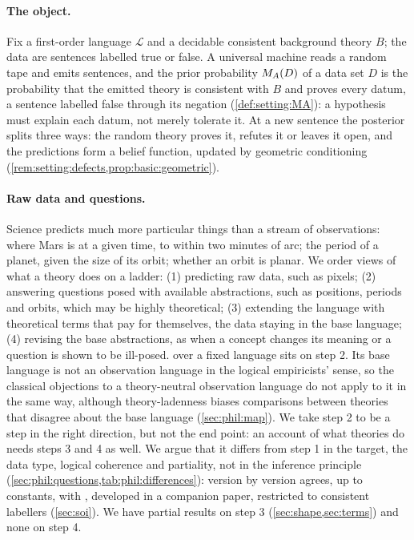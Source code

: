 \paragraph{The object.} Fix a first-order language $\mathcal L$ and a decidable consistent background theory $B$; the data are sentences labelled true or false. A universal machine reads a random tape and emits sentences, and the prior probability $M_{A}(D)$ of a data set $D$ is the probability that the emitted theory is consistent with $B$ and proves every datum, a sentence labelled false through its negation (\cref{def:setting:MA}): a hypothesis must explain each datum, not merely tolerate it. At a new sentence the posterior splits three ways: the random theory proves it, refutes it or leaves it open, and the predictions form a belief function, updated by geometric conditioning (\cref{rem:setting:defects,prop:basic:geometric}).

\paragraph{Raw data and questions.} Science predicts much more particular things than a stream of observations: where Mars is at a given time, to within two minutes of arc; the period of a planet, given the size of its orbit; whether an orbit is planar. We order views of what a theory does on a ladder: (1) predicting raw data, such as pixels; (2) answering questions posed with available abstractions, such as positions, periods and orbits, which may be highly theoretical; (3) extending the language with theoretical terms that pay for themselves, the data staying in the base language; (4) revising the base abstractions, as when a concept changes its meaning or a question is shown to be ill-posed. \SAIabbr over a fixed language sits on step 2. Its base language is not an observation language in the logical empiricists' sense, so the classical objections to a theory-neutral observation language do not apply to it in the same way, although theory-ladenness biases comparisons between theories that disagree about the base language (\cref{sec:phil:map}). We take step 2 to be a step in the right direction, but not the end point: an account of what theories do needs steps 3 and 4 as well. We argue that it differs from step 1 in the target, the data type, logical coherence and partiality, not in the inference principle (\cref{sec:phil:questions,tab:phil:differences}): version by version \SAIabbr agrees, up to constants, with \SOI \citep[\SOIabbr;][]{claudeSFI2026fundamentals}, developed in a companion paper, restricted to consistent labellers (\cref{sec:soi}). We have partial results on step 3 (\cref{sec:shape,sec:terms}) and none on step 4.

